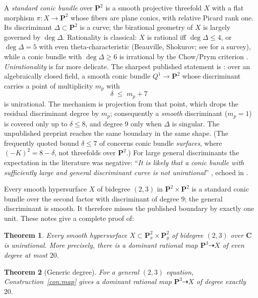 \documentclass[11pt]{amsart}
\newtheorem{theorem}{Theorem}[section]
\theoremstyle{definition}
\theoremstyle{remark}
\newcommand{\PP}{\mathbf{P}}
\newcommand{\CC}{\mathbf{C}}
\begin{document}
A \emph{standard conic bundle} over $\PP^2$ is a smooth projective threefold
$X$ with a flat morphism $\pi\colon X\to\PP^2$ whose fibers are plane
conics, with relative Picard rank one.  Its discriminant
$\Delta\subset\PP^2$ is a curve; the birational geometry of $X$ is largely
governed by $\deg\Delta$.  Rationality is classical: $X$ is rational iff
$\deg\Delta\le 4$, or $\deg\Delta=5$ with even theta-characteristic
(Beauville, Shokurov; see \cite{Prokhorov} for a survey), while a conic
bundle with $\deg\Delta\ge 6$ is irrational by the Chow/Prym criterion
\cite[Th\'eor\`eme~4.9]{Beauville}.  \emph{Unirationality} is far
more delicate.  The sharpest published statement is
\cite[Corollary~4.9]{Massarenti}: over an algebraically closed field, a
smooth conic bundle $Q^1\to\PP^2$ whose discriminant carries a point of
multiplicity $m_p$ with
\[
\delta\;\le\;m_p+7
\]
is unirational.  The mechanism is projection from that point, which drops
the residual discriminant degree by $m_p$; consequently a \emph{smooth}
discriminant ($m_p=1$) is covered only up to $\delta\le 8$, and degree $9$
only when $\Delta$ is singular.  The unpublished preprint \cite{Mella}
reaches the same boundary in the same shape.  (The frequently quoted bound
$\delta\le7$ of \cite{KollarMella} concerns conic bundle \emph{surfaces},
where $(-K)^2=8-\delta$, not threefolds over $\PP^2$.)  For large general
discriminants the expectation in the literature was negative:
``\emph{It is likely that a conic bundle with sufficiently large and
general discriminant curve is not unirational}''
\cite[\S14.3]{Prokhorov}, echoed in \cite{MassarentiMella}.

Every smooth hypersurface $X$ of bidegree $(2,3)$ in
$\PP^2\times\PP^2$ is a standard conic bundle over the second factor with
discriminant of degree $9$; the general discriminant is smooth.  It
therefore misses the published boundary by exactly one unit.  These notes
give a complete proof of:

\begin{theorem}\label{thm:main}
Every smooth hypersurface $X\subset\PP^2_x\times\PP^2_y$ of bidegree
$(2,3)$ over $\CC$ is unirational.  More precisely, there is a dominant
rational map $\PP^3\dashrightarrow X$ of even degree at most $20$.
\end{theorem}

\begin{theorem}[Generic degree]\label{thm:generic}
For a general $(2,3)$ equation, Construction~\ref{con:map} gives a dominant
rational map $\PP^3\dashrightarrow X$ of degree exactly $20$.
\end{theorem}
\end{document}
